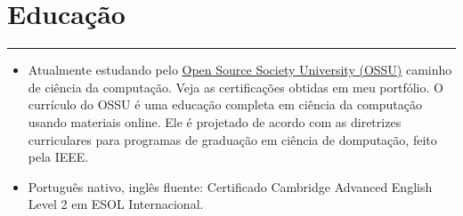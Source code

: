 \documentclass[a4paper,10pt]{article}
\newcommand{\ulink}[2]{\href{#1}{\underline{#2}}}
\begin{document}
\section*{Educação}
\hrule
\vspace{2mm}
\begin{itemize}[itemsep=0pt]
  \item Atualmente estudando pelo
        \ulink{https://github.com/ossu/computer-science}{Open Source Society University (OSSU)}
        caminho de ciência da computação. Veja as certificações obtidas em meu portfólio. O currículo do OSSU
        é uma educação completa em ciência da computação usando materiais online. Ele é projetado
        de acordo com as diretrizes curriculares para programas de graduação em ciência de domputação, feito pela IEEE.

  \item Português nativo, inglês fluente: Certificado Cambridge Advanced English Level 2
        em ESOL Internacional.
\end{itemize}
\end{document}
